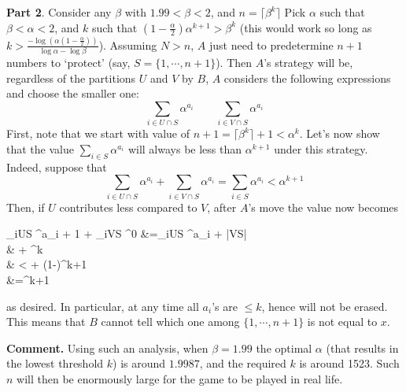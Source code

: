 \documentclass[11pt,a4paper]{article}
\begin{document}
\begin{enumerate}
		
	    \textbf{Part 2}. Consider any $\beta$ with $1.99 < \beta < 2$, 
	    and $n=\lceil \beta^k\rceil$
	    Pick $\alpha$ such that $\beta < \alpha < 2$, 
	    and $k$ such that $(1-\frac{\alpha}{2})\alpha^{k+1} > \beta^k$ 
	    (this would work so long as $k> \frac{-\log (\alpha(1-\frac{\alpha}{2}))}{\log \alpha - \log \beta}$). 
		Assuming $N > n$, $A$ just need to predetermine $n + 1$ numbers to `protect' 
		(say, $S=\{1, \cdots, n + 1\}$). 
		Then $A$'s strategy will be, regardless of the partitions $U$ and $V$ by $B$, 
		$A$ considers the following expressions and choose the smaller one: 
		\[
		\sum_{i\in U\cap S} \alpha^{a_i}
		\qquad 
		\sum_{i\in V\cap S} \alpha^{a_i}
		\]
		First, note that we start with value of $n + 1=\lceil \beta^k\rceil + 1 < \alpha^k$. 
		Let's now show that the value $\sum_{i\in S} \alpha^{a_i}$ will always be less than $\alpha^{k+1}$ under this strategy. 
		Indeed, suppose that 
		\[
		\sum_{i\in U\cap S} \alpha^{a_i} + \sum_{i\in V\cap S} \alpha^{a_i} = \sum_{i\in S} \alpha^{a_i} < \alpha^{k+1}
		\]
		Then, if $U$ contributes less compared to $V$, after $A$'s move the value now becomes 
		\begin{flalign*}
			\sum_{i\in U\cap S} \alpha^{a_i + 1} + \sum_{i\in V\cap S} \alpha^{0}
			&=\alpha\sum_{i\in U\cap S} \alpha^{a_i} + |V\cap S|
			\\&\le {} + \beta^k
			\\& <  + (1-)\alpha^{k+1}
			\\&=\alpha^{k+1}
			\\
		\end{flalign*}
	    as desired. 
	    In particular, at any time all $a_i$'s are $\le k$, hence will not be erased. 
	    This means that $B$ cannot tell which one among $\{1, \cdots, n + 1\}$ is not equal to $x$. 
	    
	    \textbf{Comment.} Using such an analysis, when $\beta=1.99$ the optimal $\alpha$ (that results in the lowest threshold $k$) is around $1.9987$, and the required $k$ is around 1523. 
	    Such $n$ will then be enormously large for the game to be played in real life. 
		
	\end{enumerate}
	
\end{document}
